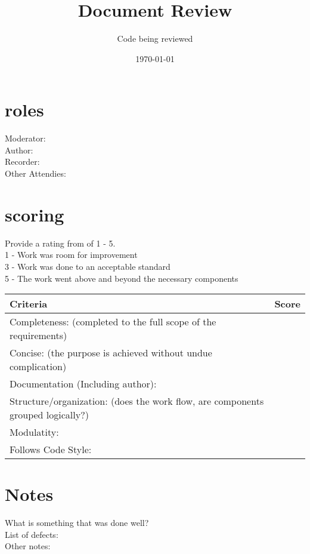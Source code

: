 \documentclass{article}
\title{Document Review}
\author{Code being reviewed }
\date{\today}
\begin{document}
\maketitle

\section{roles}
Moderator:\\
Author:\\
Recorder:\\
Other Attendies:\\

\section{scoring}
    Provide a rating from of 1 - 5. \\
    1 - Work was room for improvement\\
    3 - Work was done to an acceptable standard\\
    5 - The work went above and beyond the necessary components\\

\begin{tabular}{|l|c|}
	\hline
	Criteria & Score\\
	\hline
    Completeness:
    (completed to the full scope of the requirements) & \\
	\hline
    Concise:
    (the purpose is achieved without undue complication) & \\
	\hline
    Documentation (Including author): & \\
    \hline
    Structure/organization:
    (does the work flow, are components grouped logically?) & \\
    \hline
    Modulatity: & \\
    \hline
    Follows Code Style: & \\
    \hline
\end{tabular}

\section{Notes}
    
    What is something that was done well?\\
    
    List of defects:\\
    
    Other notes:\\
\end{document}
